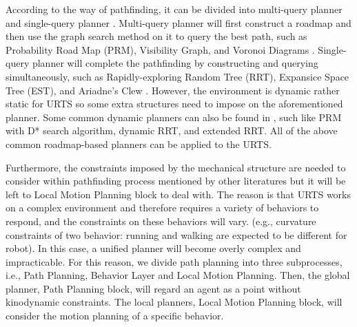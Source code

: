 \documentclass{ieeeaccess}
\begin{document}
According to the way of pathfinding, it can be divided into multi-query planner and single-query planner \cite{elbanhawi2014sampling}. Multi-query planner will first construct a roadmap and then use the graph search method on it to query the best path, such as Probability Road Map (PRM), Visibility Graph, and Voronoi Diagrams \cite{liu2018survey}. Single-query planner will complete the pathfinding by constructing and querying simultaneously,
such as Rapidly-exploring Random Tree (RRT), Expansice Space Tree (EST), and Ariadne's Clew \cite{elbanhawi2014sampling}. However, the environment is dynamic rather static for URTS so some extra structures need to impose on the aforementioned planner. Some common dynamic planners can also be found in \cite{elbanhawi2014sampling}, such like PRM with D* search algorithm, dynamic RRT, and extended RRT. All of the above common roadmap-based planners can be applied to the URTS.

Furthermore, the constraints imposed by the mechanical structure are needed to consider within pathfinding process mentioned by other literatures but it will be left to Local Motion Planning block to deal with. The reason is that URTS works on a complex environment and therefore requires a variety of behaviors to respond, and the constraints on these behaviors will vary. (e.g., curvature constraints of two behavior: running and walking are expected to be different for robot). In this case, a unified planner will become overly complex and impracticable. For this reason, we divide path planning into three subprocesses, i.e., Path Planning, Behavior Layer and Local Motion Planning. Then, the global planner, Path Planning block, will regard an agent as a point without kinodynamic constraints. The local planners, Local Motion Planning block, will consider the motion planning of a specific behavior.
\end{document}
